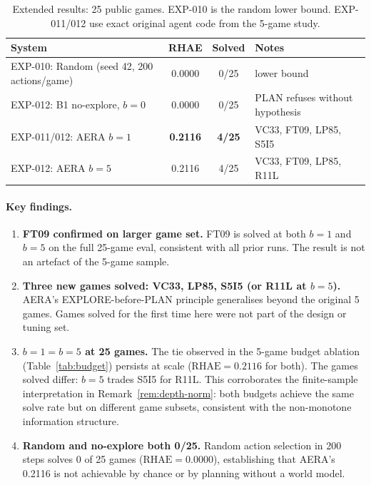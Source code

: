 \documentclass[11pt]{article}
\begin{document}
\begin{table}[h]
\centering
\caption{Extended results: 25 public games. EXP-010 is the random lower bound. EXP-011/012 use exact original agent code from the 5-game study.}
\label{tab:extended}
\begin{tabular}{lccl}
\toprule
System & RHAE & Solved & Notes \\
\midrule
EXP-010: Random (seed 42, 200 actions/game) & 0.0000 & 0/25 & lower bound \\
EXP-012: B1 no-explore, $b{=}0$ & 0.0000 & 0/25 & PLAN refuses without hypothesis \\
EXP-011/012: AERA $b{=}1$ & \textbf{0.2116} & \textbf{4/25} & VC33, FT09, LP85, S5I5 \\
EXP-012: AERA $b{=}5$ & 0.2116 & 4/25 & VC33, FT09, LP85, R11L \\
\bottomrule
\end{tabular}
\end{table}

\paragraph{Key findings.}
\begin{enumerate}[leftmargin=*]
\item \textbf{FT09 confirmed on larger game set.} FT09 is solved at both $b{=}1$ and $b{=}5$ on the full 25-game eval, consistent with all prior runs. The result is not an artefact of the 5-game sample.
\item \textbf{Three new games solved: VC33, LP85, S5I5 (or R11L at $b{=}5$).} AERA's EXPLORE-before-PLAN principle generalises beyond the original 5 games. Games solved for the first time here were not part of the design or tuning set.
\item \textbf{$b{=}1 = b{=}5$ at 25 games.} The tie observed in the 5-game budget ablation (Table~\ref{tab:budget}) persists at scale ($\text{RHAE}{=}0.2116$ for both). The games solved differ: $b{=}5$ trades S5I5 for R11L. This corroborates the finite-sample interpretation in Remark~\ref{rem:depth-norm}: both budgets achieve the same solve rate but on different game subsets, consistent with the non-monotone information structure.
\item \textbf{Random and no-explore both 0/25.} Random action selection in 200 steps solves 0 of 25 games ($\text{RHAE}{=}0.0000$), establishing that AERA's 0.2116 is not achievable by chance or by planning without a world model.
\end{enumerate}
\end{document}
